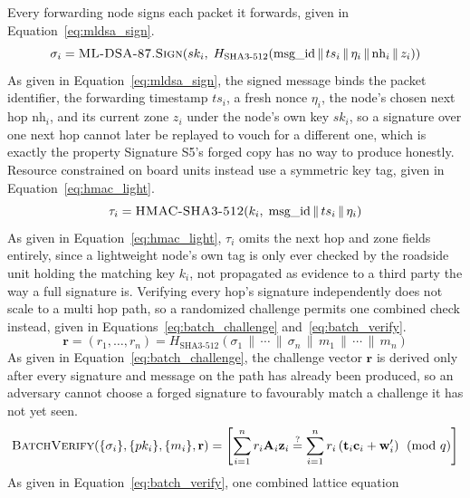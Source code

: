 \documentclass[final,5p,twocolumn]{elsarticle}
\theoremstyle{remark}
\theoremstyle{plain}
\begin{document}
Every forwarding node signs each packet it forwards, given in
Equation~\eqref{eq:mldsa_sign}.
\begin{equation}
	\sigma_i = \textsc{ML-DSA-87.Sign}\!\left(sk_i,\; H_{\text{SHA3-512}}\!\left(\text{msg\_id} \,\|\, ts_i \,\|\, \eta_i \,\|\, \text{nh}_i \,\|\, z_i\right)\right)
	\label{eq:mldsa_sign}
\end{equation}
As given in Equation~\eqref{eq:mldsa_sign}, the signed message binds the
packet identifier, the forwarding timestamp $ts_i$, a fresh nonce
$\eta_i$, the node's chosen next hop $\text{nh}_i$, and its current zone
$z_i$ under the node's own key $sk_i$, so a signature over one next hop
cannot later be replayed to vouch for a different one, which is exactly
the property Signature S5's forged copy has no way to produce honestly.
Resource constrained on board units instead use a symmetric key tag, given
in Equation~\eqref{eq:hmac_light}.
\begin{equation}
	\tau_i = \textsc{HMAC-SHA3-512}\!\left(k_i,\; \text{msg\_id} \,\|\, ts_i \,\|\, \eta_i\right)
	\label{eq:hmac_light}
\end{equation}
As given in Equation~\eqref{eq:hmac_light}, $\tau_i$ omits the next hop
and zone fields entirely, since a lightweight node's own tag is only ever
checked by the roadside unit holding the matching key $k_i$, not
propagated as evidence to a third party the way a full signature is.
Verifying every hop's signature independently does not scale to a multi hop
path, so a randomized challenge permits one combined check instead, given in
Equations~\eqref{eq:batch_challenge} and~\eqref{eq:batch_verify}.
\begin{equation}
	\mathbf{r} = (r_1, \ldots, r_n) = H_{\text{SHA3-512}}\!\left(\sigma_1 \,\|\, \cdots \,\|\, \sigma_n \,\|\, m_1 \,\|\, \cdots \,\|\, m_n\right)
	\label{eq:batch_challenge}
\end{equation}
As given in Equation~\eqref{eq:batch_challenge}, the challenge vector
$\mathbf{r}$ is derived only after every signature and message on the
path has already been produced, so an adversary cannot choose a forged
signature to favourably match a challenge it has not yet seen.
\begin{equation}
	\textsc{BatchVerify}\!\left(\{\sigma_i\}, \{pk_i\}, \{m_i\}, \mathbf{r}\right) = \left[\sum_{i=1}^{n} r_i \mathbf{A}_i \mathbf{z}_i \stackrel{?}{=} \sum_{i=1}^{n} r_i \left(\mathbf{t}_i \mathbf{c}_i + \mathbf{w}'_i\right) \pmod{q}\right]
	\label{eq:batch_verify}
\end{equation}
As given in Equation~\eqref{eq:batch_verify}, one combined lattice equation
\end{document}
